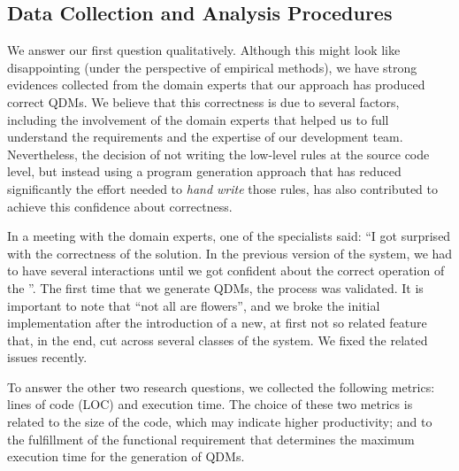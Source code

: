 

\subsection{Data Collection and Analysis Procedures}

We answer our first question qualitatively. Although this might look like disappointing (under the 
perspective of empirical methods), we have strong evidences collected from the domain experts 
that our approach has produced correct QDMs. We believe that this correctness is due to several 
factors, including the involvement of the domain experts that helped us to full understand 
the requirements and the expertise of our development team. Nevertheless, the decision of 
not writing the low-level rules at the source code level, but instead using a program 
generation approach that has reduced significantly the effort needed to \emph{hand write} 
those rules, has also contributed to achieve this confidence about correctness. 

In a meeting 
with the domain experts, one of the specialists said: ``I got surprised with the 
correctness of the solution. In the previous version of the system, we had to have several 
interactions until we got confident about the correct operation of the \callers''. The first 
time that we generate QDMs, the process was validated. It is important to note that ``not all 
are flowers'', and we broke the initial implementation after the introduction of a new, 
at first not so related feature that, in the end, cut across several classes of 
the system. We fixed the related issues recently.  

To answer the other two research questions, we collected the following metrics: lines of code (LOC) and execution time. The choice of these 
two metrics is related to the size of the code, which may indicate higher productivity; and to the fulfillment of the 
functional requirement that determines the maximum execution time for the generation of QDMs.

